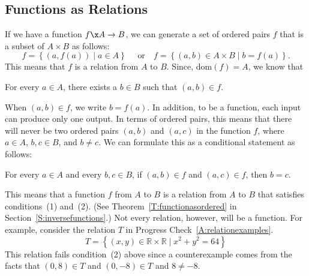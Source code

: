 \subsection*{Functions as Relations}
If we have a function  $f\x A \to B$, we can generate a set of ordered pairs  $f$  that is a subset of  $A \times B$ as follows:
\[
  f = \left\{ { {\left( {a, f( a )} \right) } \mid a \in A} \right\} \quad \text{ or}  
  \quad f = \left\{ {( {a, b} ) \in A \times B   \mid b = f( a )} \right\}.  
\]
\setcounter{equation}{0}
This means that  $f$  is a relation from  $A$  to  $B$.  Since,  
$\text{dom}( f ) = A$, we know that
\begin{list}{(1)}
\item For every $a \in A$, there exists a $b \in B$ such that $( a, b ) \in f$.
\end{list}
\vskip6pt
\noindent
When $\left( a, b \right) \in f$, we write  $b = f( a )$.  In addition, to be a function, each input can produce only one output.  In terms of ordered pairs, this means that there will never be two ordered pairs   
$( {a, b} )$ and  $( {a, c} )$  in the function  $f$,  where  $a \in A$, $b, c \in B$, and  $b \ne c$.  We can formulate this as a conditional statement as follows:
\begin{list}{(2)}
\item For every $a \in A$ and every $b, c \in B$, if $( a, b ) \in f$ and 
$(a, c ) \in f$, then $b = c$.
\end{list}
\vskip6pt
\noindent
This means that a function  $f$  from  $A$  to  $B$  is a relation from  $A$  to  $B$  that satisfies conditions~(1)
and~(2).  
(See Theorem~\ref{T:functionasordered} in Section~\ref{S:inversefunctions}.)  Not every relation, however, will be a function.  For example, consider the relation $T$ in Progress Check~\ref{A:relationexamples}.
\[
T = \left\{ {\left( {x, y} \right) \in \mathbb{R} \times \mathbb{R}   \mid x^2  + y^2  = 64} \right\}
\]
This relation fails condition~(2) above since a counterexample comes from the facts that  
$(0, 8) \in T$ and $(0, -8) \in T$ and $8 \ne -8$.

